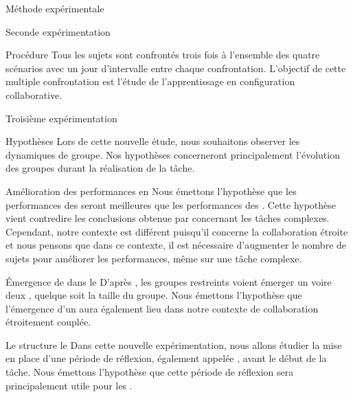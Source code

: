\documentclass[myfrancais]{mythesis}
\begin{document}
\begin{mychapter}{Méthode expérimentale}
\begin{mysection}{Seconde expérimentation}
\begin{mysubsection}{Procédure}
				Tous les sujets sont confrontés trois fois à l'ensemble des quatre scénarios avec un jour d'intervalle entre chaque confrontation.
				L'objectif de cette multiple confrontation est l'étude de l'apprentissage en configuration collaborative.
			\end{mysubsection}
		\end{mysection}
		\begin{mysection}{Troisième expérimentation}
			\begin{mysubsection}{Hypothèses}
				Lors de cette nouvelle étude, nous souhaitons observer les dynamiques de groupe.
				Nos hypothèses concerneront principalement l'évolution des groupes durant la réalisation de la tâche.
				\begin{myparagraph}{ Amélioration des performances en }
					Nous émettons l'hypothèse que les performances des  seront meilleures que les performances des .
					Cette hypothèse vient contredire les conclusions obtenue par  concernant les tâches complexes.
					Cependant, notre contexte est différent puisqu'il concerne la collaboration étroite et nous pensons que dans ce contexte, il est nécessaire d'augmenter le nombre de sujets pour améliorer les performances, même sur une tâche complexe.
				\end{myparagraph}
				\begin{myparagraph}{ Émergence de  dans le }
					D'après , les groupes restreints voient émerger un voire deux , quelque soit la taille du groupe.
					Nous émettons l'hypothèse que l'émergence d'un  aura également lieu dans notre contexte de collaboration étroitement couplée.
				\end{myparagraph}
				\begin{myparagraph}{ Le \mybrainstorming structure le }
					Dans cette nouvelle expérimentation, nous allons étudier la mise en place d'une période de réflexion, également appelée \mybrainstorming, avant le début de la tâche.
					Nous émettons l'hypothèse que cette période de réflexion sera principalement utile pour les .
				\end{myparagraph}

\end{mysubsection}
\end{mysection}
\end{mychapter}
\end{document}
